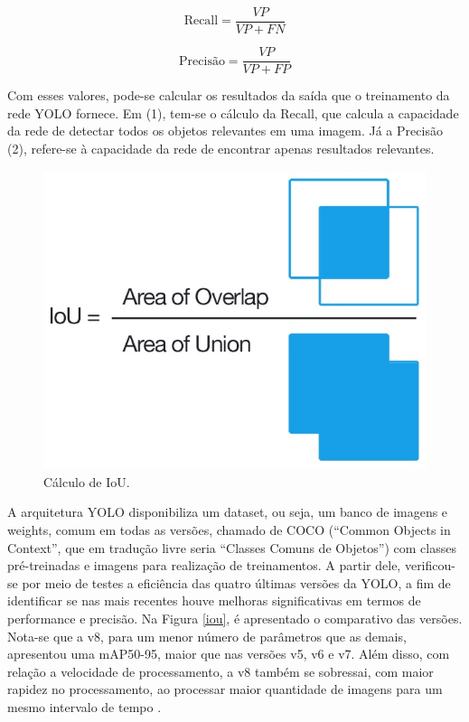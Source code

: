 \begin{equation}
    \text{Recall} = \frac{VP}{VP + FN} \tag{1}
\end{equation}
    
\begin{equation}
    \text{Precisão} = \frac{VP}{VP + FP} \tag{2}
\end{equation}

Com esses valores, pode-se calcular os resultados da saída que o treinamento da rede YOLO fornece. Em (1), tem-se o cálculo da Recall, que calcula a capacidade da rede de detectar todos os objetos relevantes em uma imagem. Já a Precisão (2), refere-se à capacidade da rede de encontrar apenas resultados relevantes. 

\begin{figure}[!h]
    \center
    \begin{minipage}{0.6\linewidth}
    \center
    \captionsetup{justification=centering,margin=0.5cm,font=small}
    \includegraphics[width=0.7\linewidth]{img/cap2/iou.png}
    \caption{ Cálculo de IoU. \cite{padilla2020survey}} \label{subfig:iou}
    \end{minipage}
\end{figure}

A arquitetura YOLO disponibiliza um dataset, ou seja, um banco de imagens e weights, comum em todas as versões, chamado de COCO (“Common Objects in Context”, que em tradução livre seria “Classes Comuns de Objetos”) com classes pré-treinadas e imagens para realização de treinamentos. A partir dele, verificou-se por meio de testes a eficiência das quatro últimas versões da YOLO, a fim de identificar se nas mais recentes houve melhoras significativas em termos de performance e precisão. Na Figura \ref{iou}, é apresentado o comparativo das versões. Nota-se que a v8, para um menor número de parâmetros que as demais, apresentou uma mAP50-95, maior que nas versões v5, v6 e v7. Além disso, com relação a velocidade de processamento, a v8 também se sobressai, com maior rapidez no processamento, ao processar maior quantidade de imagens para um mesmo intervalo de tempo \cite{padilla2020survey}.

